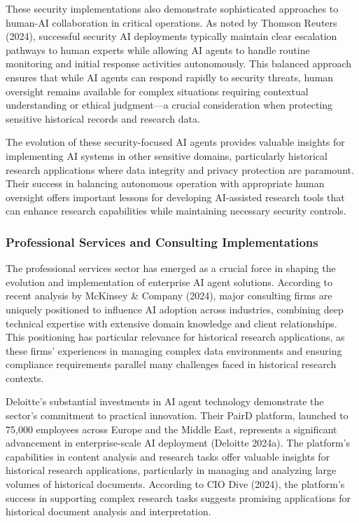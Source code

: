 \documentclass[
]{article}
\begin{document}
These security implementations also demonstrate sophisticated approaches
to human-AI collaboration in critical operations. As noted by Thomson
Reuters (2024), successful security AI deployments typically maintain
clear escalation pathways to human experts while allowing AI agents to
handle routine monitoring and initial response activities autonomously.
This balanced approach ensures that while AI agents can respond rapidly
to security threats, human oversight remains available for complex
situations requiring contextual understanding or ethical judgment---a
crucial consideration when protecting sensitive historical records and
research data.

The evolution of these security-focused AI agents provides valuable
insights for implementing AI systems in other sensitive domains,
particularly historical research applications where data integrity and
privacy protection are paramount. Their success in balancing autonomous
operation with appropriate human oversight offers important lessons for
developing AI-assisted research tools that can enhance research
capabilities while maintaining necessary security controls.

\subsubsection{Professional Services and Consulting
Implementations}\label{professional-services-and-consulting-implementations}

The professional services sector has emerged as a crucial force in
shaping the evolution and implementation of enterprise AI agent
solutions. According to recent analysis by McKinsey \& Company (2024),
major consulting firms are uniquely positioned to influence AI adoption
across industries, combining deep technical expertise with extensive
domain knowledge and client relationships. This positioning has
particular relevance for historical research applications, as these
firms' experiences in managing complex data environments and ensuring
compliance requirements parallel many challenges faced in historical
research contexts.

Deloitte's substantial investments in AI agent technology demonstrate
the sector's commitment to practical innovation. Their PairD platform,
launched to 75,000 employees across Europe and the Middle East,
represents a significant advancement in enterprise-scale AI deployment
(Deloitte 2024a). The platform's capabilities in content analysis and
research tasks offer valuable insights for historical research
applications, particularly in managing and analyzing large volumes of
historical documents. According to CIO Dive (2024), the platform's
success in supporting complex research tasks suggests promising
applications for historical document analysis and interpretation.
\end{document}
